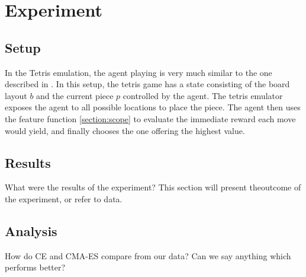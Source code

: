 \section{Experiment}

\subsection{Setup}

In the Tetris emulation, the agent playing is 
very much similar to the one described in \citep{scherrer2015}.
In this setup, the tetris game has a state consisting of the 
board layout $b$ and the current piece $p$ controlled by the agent.
The tetris emulator \cite{mdptetris} exposes the agent to all 
possible locations to place the piece. The agent then uses the 
feature function \ref{section:scope} to evaluate the immediate
reward each move would yield, and finally chooses the one offering 
the highest value.

\subsection{Results}

What were the results of the experiment? This section will
present theoutcome of the experiment, or refer to data.

\subsection{Analysis}

How do CE and CMA-ES compare from our data? Can we say anything 
which performs better?

